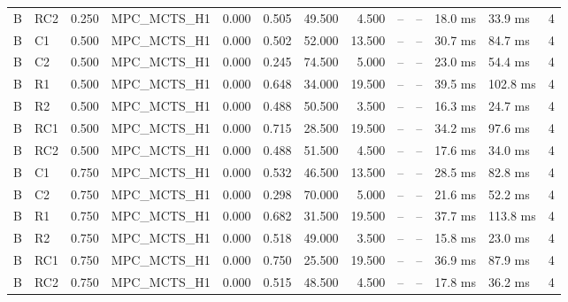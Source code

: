 \begin{table}
{\begin{tabular}{llrlrrrrrrllr}
B & RC2 & 0.250 & MPC\_MCTS\_H1 & 0.000 & 0.505 & 49.500 & 4.500 & -- & -- & 18.0 ms & 33.9 ms & 4 \\
B & C1 & 0.500 & MPC\_MCTS\_H1 & 0.000 & 0.502 & 52.000 & 13.500 & -- & -- & 30.7 ms & 84.7 ms & 4 \\
B & C2 & 0.500 & MPC\_MCTS\_H1 & 0.000 & 0.245 & 74.500 & 5.000 & -- & -- & 23.0 ms & 54.4 ms & 4 \\
B & R1 & 0.500 & MPC\_MCTS\_H1 & 0.000 & 0.648 & 34.000 & 19.500 & -- & -- & 39.5 ms & 102.8 ms & 4 \\
B & R2 & 0.500 & MPC\_MCTS\_H1 & 0.000 & 0.488 & 50.500 & 3.500 & -- & -- & 16.3 ms & 24.7 ms & 4 \\
B & RC1 & 0.500 & MPC\_MCTS\_H1 & 0.000 & 0.715 & 28.500 & 19.500 & -- & -- & 34.2 ms & 97.6 ms & 4 \\
B & RC2 & 0.500 & MPC\_MCTS\_H1 & 0.000 & 0.488 & 51.500 & 4.500 & -- & -- & 17.6 ms & 34.0 ms & 4 \\
B & C1 & 0.750 & MPC\_MCTS\_H1 & 0.000 & 0.532 & 46.500 & 13.500 & -- & -- & 28.5 ms & 82.8 ms & 4 \\
B & C2 & 0.750 & MPC\_MCTS\_H1 & 0.000 & 0.298 & 70.000 & 5.000 & -- & -- & 21.6 ms & 52.2 ms & 4 \\
B & R1 & 0.750 & MPC\_MCTS\_H1 & 0.000 & 0.682 & 31.500 & 19.500 & -- & -- & 37.7 ms & 113.8 ms & 4 \\
B & R2 & 0.750 & MPC\_MCTS\_H1 & 0.000 & 0.518 & 49.000 & 3.500 & -- & -- & 15.8 ms & 23.0 ms & 4 \\
B & RC1 & 0.750 & MPC\_MCTS\_H1 & 0.000 & 0.750 & 25.500 & 19.500 & -- & -- & 36.9 ms & 87.9 ms & 4 \\
B & RC2 & 0.750 & MPC\_MCTS\_H1 & 0.000 & 0.515 & 48.500 & 4.500 & -- & -- & 17.8 ms & 36.2 ms & 4 \\
\bottomrule
\end{tabular}
}
\end{table}
